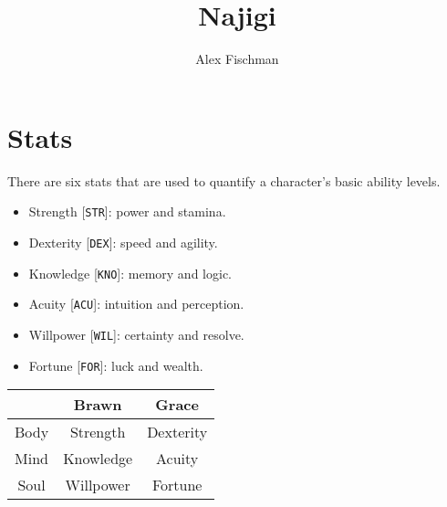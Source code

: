 \documentclass[12pt]{article}
\title{Najigi}
\author{Alex Fischman}
\newcommand{\STR}{\texttt{STR}}
\newcommand{\DEX}{\texttt{DEX}}
\newcommand{\KNO}{\texttt{KNO}}
\newcommand{\ACU}{\texttt{ACU}}
\newcommand{\WIL}{\texttt{WIL}}
\newcommand{\FOR}{\texttt{FOR}}
\begin{document}
\maketitle
\tableofcontents
\clearpage

\pagebreak
\section{Stats}

There are six stats that are used to quantify a character's basic ability levels.

\begin{multicols}{2}

\begin{itemize}
\item Strength [\STR]: power and stamina.
\item Dexterity [\DEX]: speed and agility.
\item Knowledge [\KNO]: memory and logic.
\item Acuity [\ACU]: intuition and perception.
\item Willpower [\WIL]: certainty and resolve.
\item Fortune [\FOR]: luck and wealth.
\end{itemize}

\columnbreak

\begin{tabularx}{\linewidth}{C|C C}
& Brawn & Grace \\\hline
Body & Strength & Dexterity \\
Mind & Knowledge & Acuity \\
Soul & Willpower & Fortune
\end{tabularx}

\end{multicols}
\end{document}
